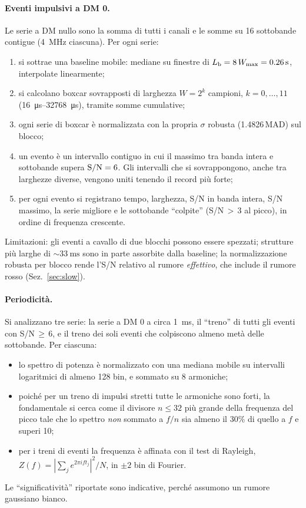 \documentclass[11pt,a4paper]{article}
\begin{document}
\paragraph{Eventi impulsivi a DM 0.} Le serie a DM nullo sono la somma di tutti i canali e le somme su 16
sottobande contigue (\SI{4}{\mega\hertz} ciascuna). Per ogni serie:
\begin{enumerate}
  \item si sottrae una baseline mobile: mediane su finestre di $L_{\rm b}=8\,W_{\max}=\SI{0.26}{\second}$,
    interpolate linearmente;
  \item si calcolano boxcar sovrapposti di larghezza $W=2^k$ campioni, $k=0,\dots,11$
    (\SIrange{16}{32768}{\micro\second}), tramite somme cumulative;
  \item ogni serie di boxcar è normalizzata con la propria $\sigma$ robusta (1.4826\,MAD) sul blocco;
  \item un evento è un intervallo contiguo in cui il massimo tra banda intera e sottobande supera
    ${\rm S/N}=6$. Gli intervalli che si sovrappongono, anche tra larghezze diverse, vengono uniti tenendo il
    record più forte;
  \item per ogni evento si registrano tempo, larghezza, S/N in banda intera, S/N massimo, la serie migliore e le
    sottobande ``colpite'' (S/N\,$>$\,3 al picco), in ordine di frequenza crescente.
\end{enumerate}
Limitazioni: gli eventi a cavallo di due blocchi possono essere spezzati; strutture più larghe di
$\sim\SI{33}{\milli\second}$ sono in parte assorbite dalla baseline; la normalizzazione robusta per blocco rende
l'S/N relativo al rumore \emph{effettivo}, che include il rumore rosso (Sez.~\ref{sec:slow}).

\paragraph{Periodicità.} Si analizzano tre serie: la serie a DM 0 a circa \SI{1}{\milli\second}, il ``treno'' di
tutti gli eventi con S/N\,$\geq$\,6, e il treno dei soli eventi che colpiscono almeno metà delle sottobande.
Per ciascuna:
\begin{itemize}
  \item lo spettro di potenza è normalizzato con una mediana mobile su intervalli logaritmici di almeno 128 bin, e
    sommato su 8 armoniche;
  \item poiché per un treno di impulsi stretti tutte le armoniche sono forti, la fondamentale si cerca come il
    divisore $n\le32$ più grande della frequenza del picco tale che lo spettro \emph{non} sommato a $f/n$ sia
    almeno il 30\% di quello a $f$ e superi 10;
  \item per i treni di eventi la frequenza è affinata con il test di Rayleigh,
    $Z(f)=|\sum_j e^{2\pi i f t_j}|^2/N$, in $\pm2$ bin di Fourier.
\end{itemize}
Le ``significatività'' riportate sono indicative, perché assumono un rumore gaussiano bianco.
\end{document}
